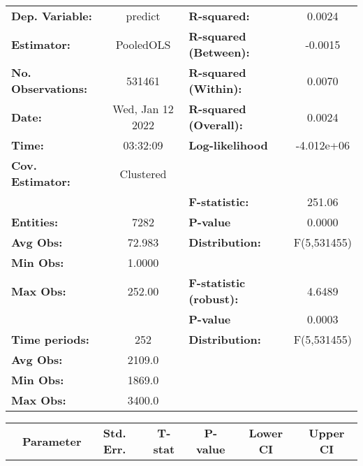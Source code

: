 \begin{center}
\begin{tabular}{lclc}
\toprule
\textbf{Dep. Variable:}    &      predict       & \textbf{  R-squared:         }   &      0.0024      \\
\textbf{Estimator:}        &     PooledOLS      & \textbf{  R-squared (Between):}  &     -0.0015      \\
\textbf{No. Observations:} &       531461       & \textbf{  R-squared (Within):}   &      0.0070      \\
\textbf{Date:}             &  Wed, Jan 12 2022  & \textbf{  R-squared (Overall):}  &      0.0024      \\
\textbf{Time:}             &      03:32:09      & \textbf{  Log-likelihood     }   &    -4.012e+06    \\
\textbf{Cov. Estimator:}   &     Clustered      & \textbf{                     }   &                  \\
\textbf{}                  &                    & \textbf{  F-statistic:       }   &      251.06      \\
\textbf{Entities:}         &        7282        & \textbf{  P-value            }   &      0.0000      \\
\textbf{Avg Obs:}          &       72.983       & \textbf{  Distribution:      }   &   F(5,531455)    \\
\textbf{Min Obs:}          &       1.0000       & \textbf{                     }   &                  \\
\textbf{Max Obs:}          &       252.00       & \textbf{  F-statistic (robust):} &      4.6489      \\
\textbf{}                  &                    & \textbf{  P-value            }   &      0.0003      \\
\textbf{Time periods:}     &        252         & \textbf{  Distribution:      }   &   F(5,531455)    \\
\textbf{Avg Obs:}          &       2109.0       & \textbf{                     }   &                  \\
\textbf{Min Obs:}          &       1869.0       & \textbf{                     }   &                  \\
\textbf{Max Obs:}          &       3400.0       & \textbf{                     }   &                  \\
\bottomrule
\end{tabular}
\begin{tabular}{lcccccc}
                & \textbf{Parameter} & \textbf{Std. Err.} & \textbf{T-stat} & \textbf{P-value} & \textbf{Lower CI} & \textbf{Upper CI}  \\

\end{tabular}
\end{center}
